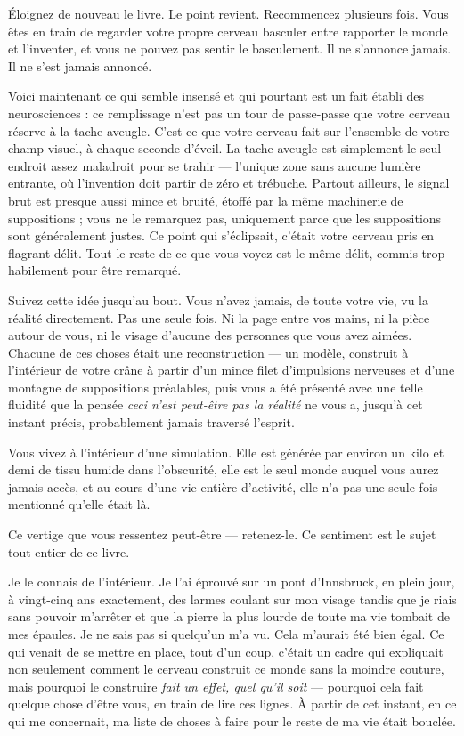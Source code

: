 \documentclass[11pt, twoside, openright]{book}
\begin{document}
Éloignez de nouveau le livre. Le point revient. Recommencez plusieurs fois. Vous êtes en train de regarder votre propre cerveau basculer entre rapporter le monde et l'inventer, et vous ne pouvez pas sentir le basculement. Il ne s'annonce jamais. Il ne s'est jamais annoncé.

Voici maintenant ce qui semble insensé et qui pourtant est un fait établi des neurosciences : ce remplissage n'est pas un tour de passe-passe que votre cerveau réserve à la tache aveugle. C'est ce que votre cerveau fait sur l'ensemble de votre champ visuel, à chaque seconde d'éveil. La tache aveugle est simplement le seul endroit assez maladroit pour se trahir --- l'unique zone sans aucune lumière entrante, où l'invention doit partir de zéro et trébuche. Partout ailleurs, le signal brut est presque aussi mince et bruité, étoffé par la même machinerie de suppositions ; vous ne le remarquez pas, uniquement parce que les suppositions sont généralement justes. Ce point qui s'éclipsait, c'était votre cerveau pris en flagrant délit. Tout le reste de ce que vous voyez est le même délit, commis trop habilement pour être remarqué.

Suivez cette idée jusqu'au bout. Vous n'avez jamais, de toute votre vie, vu la réalité directement. Pas une seule fois. Ni la page entre vos mains, ni la pièce autour de vous, ni le visage d'aucune des personnes que vous avez aimées. Chacune de ces choses était une reconstruction --- un modèle, construit à l'intérieur de votre crâne à partir d'un mince filet d'impulsions nerveuses et d'une montagne de suppositions préalables, puis vous a été présenté avec une telle fluidité que la pensée \textit{ceci n'est peut-être pas la réalité} ne vous a, jusqu'à cet instant précis, probablement jamais traversé l'esprit.

Vous vivez à l'intérieur d'une simulation. Elle est générée par environ un kilo et demi de tissu humide dans l'obscurité, elle est le seul monde auquel vous aurez jamais accès, et au cours d'une vie entière d'activité, elle n'a pas une seule fois mentionné qu'elle était là.

Ce vertige que vous ressentez peut-être --- retenez-le. Ce sentiment est le sujet tout entier de ce livre.

Je le connais de l'intérieur. Je l'ai éprouvé sur un pont d'Innsbruck, en plein jour, à vingt-cinq ans exactement, des larmes coulant sur mon visage tandis que je riais sans pouvoir m'arrêter et que la pierre la plus lourde de toute ma vie tombait de mes épaules. Je ne sais pas si quelqu'un m'a vu. Cela m'aurait été bien égal. Ce qui venait de se mettre en place, tout d'un coup, c'était un cadre qui expliquait non seulement comment le cerveau construit ce monde sans la moindre couture, mais pourquoi le construire \textit{fait un effet, quel qu'il soit} --- pourquoi cela fait quelque chose d'être vous, en train de lire ces lignes. À partir de cet instant, en ce qui me concernait, ma liste de choses à faire pour le reste de ma vie était bouclée.
\end{document}

